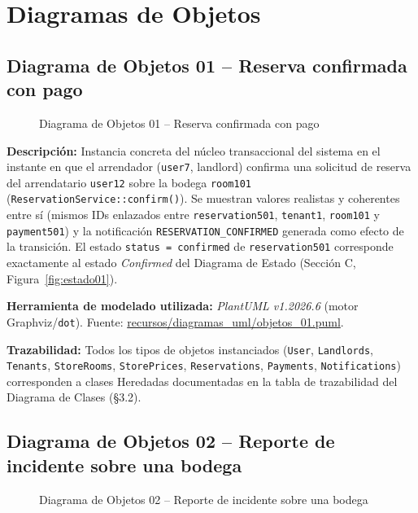 \section{Diagramas de Objetos}

\subsection{Diagrama de Objetos 01 -- Reserva confirmada con pago}
\begin{figure}[H]
    \centering
    \caption{Diagrama de Objetos 01 -- Reserva confirmada con pago}
    \label{fig:objetos01}
\end{figure}

\noindent\textbf{Descripción:} Instancia concreta del núcleo transaccional del sistema en el instante en que el arrendador (\texttt{user7}, landlord) confirma una solicitud de reserva del arrendatario \texttt{user12} sobre la bodega \texttt{room101} (\texttt{ReservationService::confirm()}). Se muestran valores realistas y coherentes entre sí (mismos IDs enlazados entre \texttt{reservation501}, \texttt{tenant1}, \texttt{room101} y \texttt{payment501}) y la notificación \texttt{RESERVATION\_CONFIRMED} generada como efecto de la transición. El estado \texttt{status = confirmed} de \texttt{reservation501} corresponde exactamente al estado \emph{Confirmed} del Diagrama de Estado (Sección C, Figura~\ref{fig:estado01}).

\bigskip
\noindent\textbf{Herramienta de modelado utilizada:} \textit{PlantUML v1.2026.6} (motor Graphviz/\texttt{dot}). Fuente: \url{recursos/diagramas_uml/objetos_01.puml}.

\bigskip
\noindent\textbf{Trazabilidad:} Todos los tipos de objetos instanciados (\texttt{User}, \texttt{Landlords}, \texttt{Tenants}, \texttt{StoreRooms}, \texttt{StorePrices}, \texttt{Reservations}, \texttt{Payments}, \texttt{Notifications}) corresponden a clases Heredadas documentadas en la tabla de trazabilidad del Diagrama de Clases (\S3.2).
\clearpage

\subsection{Diagrama de Objetos 02 -- Reporte de incidente sobre una bodega}
\begin{figure}[H]
    \centering
    \caption{Diagrama de Objetos 02 -- Reporte de incidente sobre una bodega}
    \label{fig:objetos02}
\end{figure}


